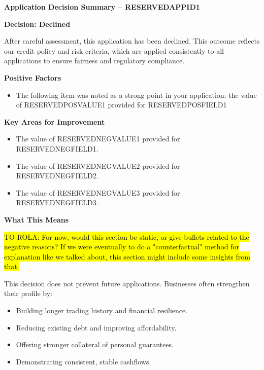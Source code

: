 \documentclass[a4paper,12pt]{article} %
\begin{document}
	
{\bf Application Decision Summary -- RESERVEDAPPID1}\bigskip

{\bf Decision:  Declined}\bigskip

\noindent After careful assessment, this application has been declined.
This outcome reflects our credit policy and risk criteria, which are applied consistently to all
applications to ensure fairness and regulatory compliance.

\bigskip
\noindent %
\makebox[\linewidth]{\rule{\textwidth}{0.4pt}} %
\bigskip

{\bf Positive Factors}
\begin{itemize}
	\item The following item was noted as a strong point in your application:  the value of RESERVEDPOSVALUE1 provided for RESERVEDPOSFIELD1
\end{itemize}

\bigskip
\noindent %
\makebox[\linewidth]{\rule{\textwidth}{0.4pt}} %
\bigskip

{\bf Key Areas for Improvement}
\bigskip

\begin{itemize}
	\item  The value of RESERVEDNEGVALUE1 provided for RESERVEDNEGFIELD1.
	\item  The value of RESERVEDNEGVALUE2 provided for RESERVEDNEGFIELD2.
	\item  The value of RESERVEDNEGVALUE3 provided for RESERVEDNEGFIELD3.
\end{itemize}

\bigskip
\noindent %
\makebox[\linewidth]{\rule{\textwidth}{0.4pt}}
\bigskip

{\bf What This Means}
\bigskip

\hl{TO ROLA: For now, would this section be static, or give bullets related to the negative reasons?  If we were eventually to do a "counterfactual" method for explanation like we talked about, this section might include some insights from that.\\ \bigskip}


\noindent This decision does not prevent future applications. Businesses often strengthen their profile by:
\begin{itemize}
	\item Building longer trading history and financial resilience.
	\item  Reducing existing debt and improving affordability.
	\item  Offering stronger collateral of personal guarantees.
	\item  Demonstrating consistent, stable cashflows.
\end{itemize}
\end{document}
